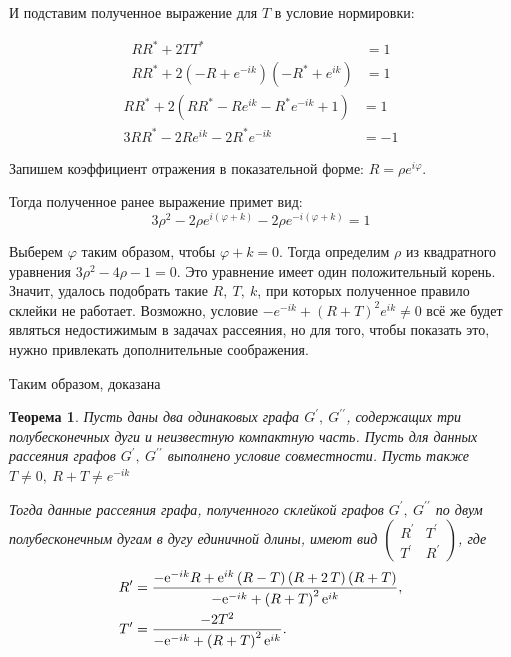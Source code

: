 \documentclass[a4 paper, 12 pt]{extarticle}
\newtheorem{theorem}{Теорема}[section]
\begin{document}
   И подставим полученное выражение для $T$ в условие нормировки:
   
   \[
   \begin{aligned}
   RR^* + 2TT^* &= 1\\
   RR^* + 2\left(-R + e^{-ik}\right)\left(-R^* + e^{ik}\right) &= 1
   \end{aligned}\]
   \[
   \begin{aligned}
   RR^* + 2\left(RR^* -Re^{ik} -R^*e^{-ik} + 1\right) &= 1\\
   3RR^* -2Re^{ik}-2R^*e^{-ik} &= -1
   \end{aligned}
   \]
   
   Запишем коэффициент отражения в показательной форме: $R = \rho e^{i \varphi}$.
   
   Тогда полученное ранее выражение примет вид:
   \[
   3 \rho^2 -2 \rho e^{i\left(\varphi+k\right)} -2 \rho e^{-i\left(\varphi+k\right)} = 1
   \]
   
   Выберем $\varphi$ таким образом, чтобы $\varphi + k = 0$. Тогда определим $\rho$ из квадратного уравнения $3\rho^2 -4\rho -1 = 0$.
   Это уравнение имеет один положительный корень. Значит, удалось подобрать такие $R, \ T, \ k$, при которых полученное правило склейки не работает. Возможно, условие $-e^{-ik} + \left(R+T\right)^2 e^{ik} \neq 0$ всё же будет являться недостижимым в задачах рассеяния, но для того, чтобы показать это, нужно привлекать дополнительные соображения.
   
   Таким образом, доказана
   
   \begin{theorem}
   	Пусть даны два одинаковых графа $G^\prime, \ G^{\prime\prime}$, содержащих три полубесконечных дуги и неизвестную компактную часть. Пусть для данных рассеяния графов  $G^\prime, \ G^{\prime\prime}$ выполнено условие совместности. Пусть также $T \neq 0, \ R+T \neq e^{-ik}$
   	
   	Тогда данные рассеяния графа, полученного склейкой графов $G^\prime, \ G^{\prime\prime}$ по двум полубесконечным дугам в дугу единичной длины, имеют вид $\left(\begin{matrix}
   	R^\prime & T^\prime \\
   	T^\prime & R^\prime
   	\end{matrix}\right)$, где
   	\[
   	\begin{aligned}
   	R^\prime &= {\frac {-{{\rm e}^{-ik}}R+{{\rm e}^{ik}} \left( R-T \right)  \left( R+
		2\,T \right)  \left( R+T \right) }{-{{\rm e}^{-ik}}+ \left(R+T\right)^2 {{\rm e}^{ik}}}}, \\
    T^\prime &= {\frac {-2{T}^{2}}{-{{\rm e}^{-ik}}+ \left(R+T\right)^2 {{\rm e}^{ik}}}}.
   	\end{aligned}\]
   \end{theorem}
\end{document}
